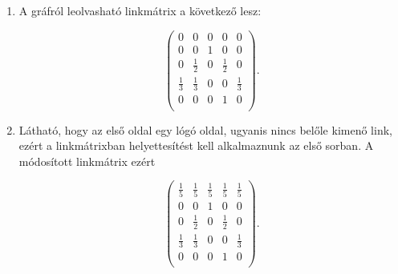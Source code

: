 \documentclass[12pt,a4paper]{article}
\begin{document}
\begin{enumerate}[label=(\Roman*)]
\item A gráfról leolvasható linkmátrix a következő lesz:
\vspace{-1cm}
\begin{center}
	\[
	\begin{pmatrix}
	0 & 0 & 0 & 0 & 0 \\
	0 & 0 & 1 & 0 & 0 \\
	0 & \frac{1}{2} & 0 & \frac{1}{2} & 0 \\
	\frac{1}{3} & \frac{1}{3} & 0 & 0 & \frac{1}{3} \\
	0 & 0 & 0 & 1 & 0 \\
	\end{pmatrix}.
	\]
\end{center}

\item Látható, hogy az első oldal egy lógó oldal, ugyanis nincs belőle kimenő link, ezért a linkmátrixban helyettesítést kell alkalmaznunk az első sorban. A módosított linkmátrix ezért
\vspace{-1cm}
\begin{center}
	\[
	\begin{pmatrix}
	\frac{1}{5} & \frac{1}{5} & \frac{1}{5} & \frac{1}{5} & \frac{1}{5} \\
	0 & 0 & 1 & 0 & 0 \\
	0 & \frac{1}{2} & 0 & \frac{1}{2} & 0 \\
	\frac{1}{3} & \frac{1}{3} & 0 & 0 & \frac{1}{3} \\
	0 & 0 & 0 & 1 & 0 \\
	\end{pmatrix}.
	\]
\end{center}


\end{enumerate}
\end{document}

